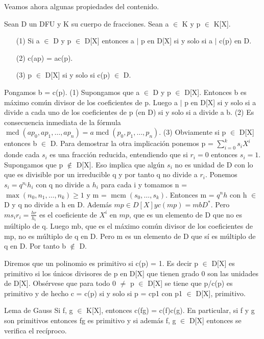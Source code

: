 Veamos ahora algunas propiedades del contenido.

\begin{proposition}{}{}
Sean D un DFU y K su cuerpo de fracciones. Sean a $\in$ K y p $\in$ K[X].

\begin{enumerate}
\item[(1)] Si a $\in$ D y p $\in$ D[X] entonces a $|$ p en D[X] si y solo si a $|$ c(p) en D.
\item[(2)] c(ap) = ac(p).
\item[(3)] p $\in$ D[X] si y solo si c(p) $\in$ D.
\end{enumerate}
\end{proposition}

\begin{proofbox}
Pongamos b = c(p).
(1) Supongamos que a $\in$ D y p $\in$ D[X]. Entonces b es máximo común divisor de los coeficientes de p. Luego a $|$ p en D[X] si y solo si a divide a cada uno de los coeficientes de p (en D) si y solo si a divide a b.
(2) Es consecuencia inmediata de la fórmula $\operatorname{mcd}(ap_0, ap_1, \ldots, ap_n) = a \operatorname{mcd}(p_0, p_1, \ldots, p_n)$.
(3) Obviamente si p $\in$ D[X] entonces b $\in$ D. Para demostrar la otra implicación ponemos p = $\sum_{i=0}^k s_i X^i$ donde cada $s_i$ es una fracción reducida, entendiendo que si $r_i = 0$ entonces $s_i = 1$. Supongamos que p $\notin$ D[X]. Eso implica que algún $s_i$ no es unidad de D con lo que es divisible por un irreducible q y por tanto q no divide a $r_i$. Ponemos $s_i = q^{n_i} h_i$ con q no divide a $h_i$ para cada i y tomamos n = $\max(n_0, n_1, \ldots, n_k) \geq 1$ y m = $\operatorname{mcm}(s_0, \ldots, s_k)$. Entonces m = $q^n h$ con h $\in$ D y q no divide a h en D. Además $mp \in D[X] y c(mp) = mbD^*$. Pero $m s_i r_i = \frac{h r}{h_i}$ es el coeficiente de $X^i$ en $mp$, que es un elemento de D que no es múltiplo de q. Luego mb, que es el máximo común divisor de los coeficientes de mp, no es múltiplo de q en D. Pero m es un elemento de D que sí es múltiplo de q en D. Por tanto b $\notin$ D.
\end{proofbox}

Diremos que un polinomio es primitivo si c(p) = 1. Es decir p $\in$ D[X] es primitivo si los únicos divisores de p en D[X] que tienen grado 0 son las unidades de D[X]. Obsérvese que para todo 0 $\neq$ p $\in$ D[X] se tiene que p/c(p) es primitivo y de hecho c = c(p) si y solo si p = cp1 con p1 $\in$ D[X], primitivo.

\begin{lemma}{Lema de Gauss}{}
Si f, g $\in$ K[X], entonces c(fg) = c(f)c(g). En particular, si f y g son primitivos entonces fg es primitivo y si además f, g $\in$ D[X] entonces se verifica el recíproco.
\end{lemma}


